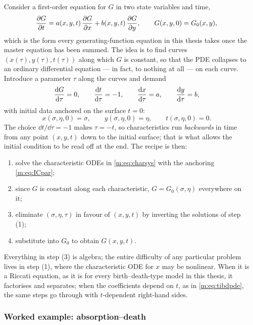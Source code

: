Consider a first-order equation for $G$ in two state variables and time,
\begin{equation}
\label{m:eq:generalpde}
\frac{\partial G}{\partial t} = a(x,y,t)\,\frac{\partial G}{\partial x} + b(x,y,t)\,\frac{\partial G}{\partial y},
\qquad
G(x,y,0) = G_0(x,y),
\end{equation}
which is the form every generating-function equation in this thesis takes once
the master equation has been summed. The idea is to find curves
$(x(\tau),y(\tau),t(\tau))$ along which $G$ is constant, so that the PDE
collapses to an ordinary differential equation --- in fact, to nothing at all
--- on each curve. Introduce a parameter $\tau$ along the curves and demand
\begin{equation}
\label{m:eq:charsys}
\frac{\mathrm{d} G}{\mathrm{d} \tau} = 0,
\qquad
\frac{\mathrm{d} t}{\mathrm{d} \tau} = -1,
\qquad
\frac{\mathrm{d} x}{\mathrm{d} \tau} = a,
\qquad
\frac{\mathrm{d} y}{\mathrm{d} \tau} = b ,
\end{equation}
with initial data anchored on the surface $t=0$:
\begin{equation}
\label{m:eq:ICpar}
x(\sigma,\eta,0)=\sigma,
\qquad
y(\sigma,\eta,0)=\eta,
\qquad
t(\sigma,\eta,0)=0 .
\end{equation}
The choice $\dd t/\dd\tau=-1$ makes $\tau=-t$, so characteristics run
\emph{backwards} in time from any point $(x,y,t)$ down to the initial surface;
that is what allows the initial condition to be read off at the end. The recipe
is then:
\begin{enumerate}[label=\textup{(\arabic*)}]
\item solve the characteristic ODEs in \cref{m:eq:charsys} with the anchoring
\cref{m:eq:ICpar};
\item since $G$ is constant along each characteristic,
$G = G_0(\sigma,\eta)$ everywhere on it;
\item eliminate $(\sigma,\eta,\tau)$ in favour of $(x,y,t)$ by inverting the
solutions of step \textup{(1)};
\item substitute into $G_0$ to obtain $G(x,y,t)$.
\end{enumerate}
Everything in step \textup{(3)} is algebra; the entire difficulty of any
particular problem lives in step \textup{(1)}, where the characteristic ODE for
$x$ may be nonlinear. When it is a Riccati equation, as it is for every
birth--death-type model in this thesis, it factorises and separates; when the
coefficients depend on $t$, as in \cref{m:eq:tibdpde}, the same steps go
through with $t$-dependent right-hand sides.

\subsubsection{Worked example: absorption--death}
\label{m:sec:mocabsdeath}

